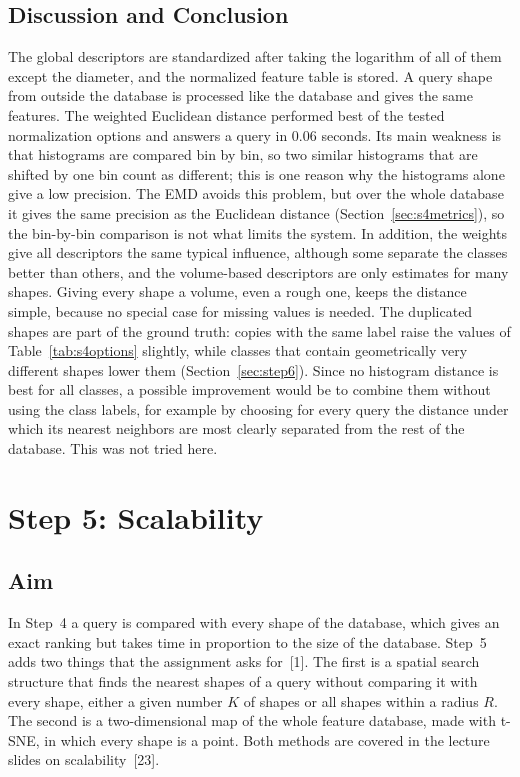 \documentclass[10pt,a4paper]{article}
\begin{document}
\subsection{Discussion and Conclusion}
The global descriptors are standardized after taking the logarithm of all of them except the diameter, and the normalized feature
table is stored. A query shape from outside the database is processed like the database and gives the same features. The weighted
Euclidean distance performed best of the tested normalization options and answers a query in 0.06 seconds. Its main weakness is
that histograms are compared bin by bin, so two similar histograms that are shifted by one bin count as different; this is one
reason why the histograms alone give a low precision. The EMD avoids this problem, but over the whole database it gives the same
precision as the Euclidean distance (Section~\ref{sec:s4metrics}), so the bin-by-bin comparison is not what limits the system. In
addition, the weights give all descriptors the same typical influence, although some separate the classes better than others, and the volume-based
descriptors are only estimates for many shapes. Giving every shape a volume, even a rough one, keeps the distance simple, because
no special case for missing values is needed. The duplicated shapes are part of the ground truth: copies with the same label raise
the values of Table~\ref{tab:s4options} slightly, while classes that contain geometrically very different shapes lower them
(Section~\ref{sec:step6}). Since no histogram distance is best for all classes, a possible improvement would be to combine them
without using the class labels, for example by choosing for every query the distance under which its nearest neighbors are most
clearly separated from the rest of the database. This was not tried here.

\section{Step 5: Scalability}\label{sec:step5}

\subsection{Aim}
In Step~4 a query is compared with every shape of the database, which gives an exact ranking but takes time in proportion to
the size of the database. Step~5 adds two things that the assignment asks for~[1]. The first is a spatial search structure that
finds the nearest shapes of a query without comparing it with every shape, either a given number $K$ of shapes or all shapes
within a radius $R$. The second is a two-dimensional map of the whole feature database, made with t-SNE, in which every shape is
a point. Both
methods are covered in the lecture slides on scalability~[23].
\end{document}
